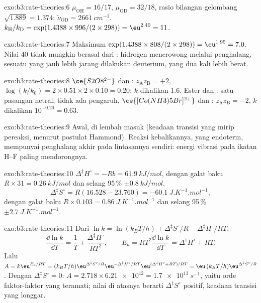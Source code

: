 \begin{solution}{exo:b3:rate-theories:6}
$\mu_{\mathrm{OH}} = 16/17$, $\mu_{\mathrm{OD}} = 32/18$, rasio bilangan gelombang
$\sqrt{1.889} = 1.374$:
$\tilde\nu_{\mathrm{OD}} = \qty{2661}{cm^{-1}}$. $k_{\mathrm H}/k_{\mathrm D} = \exp(1.4388 \times 996/(2 \times 298)) = \eu^{2.40} = 11$.
\end{solution}

\begin{solution}{exo:b3:rate-theories:7}
Maksimum $\exp(1.4388 \times 808/(2 \times 298)) = \eu^{1.95} = 7.0$. Nilai 40 tidak
mungkin berasal dari : hidrogen menerowong melalui
penghalang, sesuatu yang jauh lebih jarang dilakukan deuterium, yang dua kali
lebih berat.
\end{solution}

\begin{solution}{exo:b3:rate-theories:8}
$\ce{S2O8^{2-}}$ dan : $z_{\mathrm A}z_{\mathrm B} = +2$, $\log(k/k_0) = 2 \times 0.51 \times 2 \times 0.10 = 0.20$:
$k$ dikalikan 1.6. Ester dan : satu pasangan netral, tidak ada
pengaruh. $\ce{[Co(NH3)5Br]^{2+}}$ dan : $z_{\mathrm A}z_{\mathrm B} = -2$, $k$ dikalikan
$10^{-0.20} = 0.63$.
\end{solution}

\begin{solution}{exo:b3:rate-theories:9}
Awal, di lembah masuk (keadaan transisi yang mirip pereaksi, menurut postulat
Hammond). Reaksi kebalikannya, yang endoterm, mempunyai penghalang akhir pada
lintasannya sendiri: energi vibrasi pada ikatan H--F paling mendorongnya.
\end{solution}

\begin{solution}{exo:b3:rate-theories:10}
$\Delta^{\ddagger}H^\circ = -Rb = \qty{61.9}{kJ/mol}$, dengan galat baku
$R \times 31 = \qty{0.26}{kJ/mol}$ dan selang 95\,\% $\pm\qty{0.8}{kJ/mol}$.
\[
  \Delta^{\ddagger}S^\circ = R(16.528 - 23.760) = \qty{-60.1}{J.K^{-1}.mol^{-1}},
\]
dengan galat baku $R \times 0.103 = \qty{0.86}{J.K^{-1}.mol^{-1}}$ dan selang 95\,\% $\pm\qty{2.7}{J.K^{-1}.mol^{-1}}$.
\end{solution}

\begin{solution}{exo:b3:rate-theories:11}
Dari $\ln k = \ln(k_BT/h) + \Delta^{\ddagger}S^\circ/R - \Delta^{\ddagger}H^\circ/RT$,
\[
  \frac{\dd\ln k}{\dd T} = \frac1T + \frac{\Delta^{\ddagger}H^\circ}{RT^2}, \qquad
  E_a = RT^2\frac{\dd\ln k}{\dd T} = \Delta^{\ddagger}H^\circ + RT .
\] Lalu $A = k\eu^{E_a/RT} = (k_BT/h)\eu^{\Delta^{\ddagger}S^\circ/R}\eu^{-\Delta^{\ddagger}H^\circ/RT}\eu^{(\Delta^{\ddagger}H^\circ + RT)/RT} =
\eu\,(k_BT/h)\eu^{\Delta^{\ddagger}S^\circ/R}$. Dengan $\Delta^{\ddagger}S^\circ = 0$:
$A = 2.718 \times \num{6.21e12} = \qty{1.7e13}{s^{-1}}$, yaitu orde faktor-faktor yang
teramati; nilai di atasnya berarti $\Delta^{\ddagger}S^\circ$ positif, keadaan
transisi yang longgar.
\end{solution}

